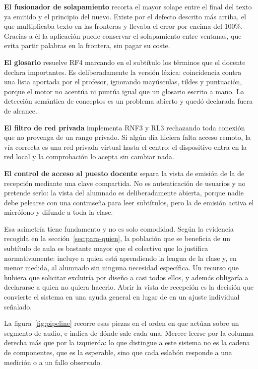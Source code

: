 \textbf{El fusionador de solapamiento} recorta el mayor solape entre el final del texto ya
emitido y el principio del nuevo. Existe por el defecto descrito más arriba, el que
multiplicaba texto en las fronteras y llevaba el error por encima del 100\%. Gracias a él la
aplicación puede conservar el solapamiento entre ventanas, que evita partir palabras en la
frontera, sin pagar su coste.

\textbf{El glosario} resuelve RF4 marcando en el subtítulo los términos que el docente
declara importantes. Es deliberadamente la versión léxica: coincidencia contra una lista
aportada por el profesor, ignorando mayúsculas, tildes y puntuación, porque el motor no
acentúa ni puntúa igual que un glosario escrito a mano. La detección semántica de conceptos
es un problema abierto y quedó declarada fuera de alcance.

\textbf{El filtro de red privada} implementa RNF3 y RL3 rechazando toda conexión que no
provenga de un rango privado. Si algún día hiciera falta acceso remoto, la vía correcta es
una red privada virtual hasta el centro: el dispositivo entra en la red local y la
comprobación lo acepta sin cambiar nada.

\textbf{El control de acceso al puesto docente} separa la vista de emisión de la de
recepción mediante una clave compartida. No es autenticación de usuarios y no pretende
serlo: la vista del alumnado es deliberadamente abierta, porque nadie debe pelearse con una
contraseña para leer subtítulos, pero la de emisión activa el micrófono y difunde a toda la
clase.

Esa asimetría tiene fundamento y no es solo comodidad. Según la evidencia recogida en la
sección~\ref{sec:para-quien}, la población que se beneficia de un subtítulo de aula es
bastante mayor que el colectivo que lo justifica normativamente: incluye a quien está
aprendiendo la lengua de la clase y, en menor medida, al alumnado sin ninguna necesidad
específica. Un recurso que hubiera que solicitar excluiría por diseño a casi todos ellos,
y además obligaría a declararse a quien no quiera hacerlo. Abrir la vista de recepción es
la decisión que convierte el sistema en una ayuda general en lugar de en un ajuste
individual señalado.

La figura~\ref{fig:pipeline} recorre esas piezas en el orden en que actúan sobre un segmento
de audio, e indica de dónde sale cada una. Merece leerse por la columna derecha más que por
la izquierda: lo que distingue a este sistema no es la cadena de componentes, que es la
esperable, sino que cada eslabón responde a una medición o a un fallo observado.


